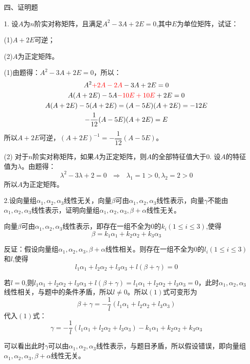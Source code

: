 \documentclass{article}
\begin{document}
四、证明题

1. 设$A$为$n$阶实对称矩阵，且满足$A^{2}-3A+2E=0$,其中$E$为单位矩阵，试证：

(1)$A+2E$可逆；

(2)$A$为正定矩阵。

\begin{zhengming}
(1)由题得：$A^{2}-3A+2E=0$，所以：
\begin{gather*}
  A^{2}\textcolor[rgb]{1.00,0.00,0.00}{+2A-2A}-3A+2E=0 \\
  A(A+2E)-5A\textcolor[rgb]{1.00,0.00,0.00}{-10E+10E}+2E=0 \\
  A(A+2E)-5(A+2E)=(A-5E)(A+2E)=-12E\\
  -\frac{1}{12}(A-5E)(A+2E)=E
\end{gather*}
所以$A+2E$可逆，$(A+2E)^{-1}=-\dfrac{1}{12}(A-5E)$。

(2) 对于$n$阶实对称矩阵，如果$A$为正定矩阵，则$A$的全部特征值大于0.
设$A$的特征值为$\lambda$。由题得：
\begin{equation*}
\lambda^2-3\lambda+2=0~~~\Rightarrow~~~\lambda_1=1>0,\lambda_2=2>0
\end{equation*}
所以$A$为正定矩阵。
\end{zhengming}

2.设向量组$\alpha_{1},\alpha_{2},\alpha_{3}$线性无关，向量$\beta$可由$\alpha_{1},\alpha_{2},\alpha_{3}$线性表示，向量$\gamma$不能由$\alpha_{1},\alpha_{2},\alpha_{3}$线性表示，证明向量组$\alpha_{1},\alpha_{2},\alpha_{3},\beta+\alpha$线性无关。

\begin{zhengming}
向量$\beta$可由$\alpha_{1},\alpha_{2},\alpha_{3}$线性表示，即存在一组不全为0的$k_{i}(1\leq i\leq3)$,使得
\begin{equation*}
 \beta=k_ {1}\alpha_{1}+k_{2}\alpha_{2}+k_{3}\alpha_{3}\tag{$1$}
\end{equation*}

反证：假设向量组$\alpha_{1},\alpha_{2},\alpha_{3},\beta+\alpha$线性相关。则存在一组不全为0的$l_{i}(1\leq i\leq3)$和$l$,使得
\begin{equation*}
l_ {1}\alpha_{1}+l_{2}\alpha_{2}+l_{3}\alpha_{3}+l(\beta+\gamma)=0\tag{$2$}
\end{equation*}

若$l=0$,则$l_ {1}\alpha_{1}+l_{2}\alpha_{2}+l_{3}\alpha_{3}+l(\beta+\gamma)=l_ {1}\alpha_{1}+l_{2}\alpha_{2}+l_{3}\alpha_{3}=0$，此时$\alpha_{1},\alpha_{2},\alpha_{3}$线性相关，与题中的条件矛盾，所以$l\neq0$。所以$(1)$式可变形为
\begin{equation*}
\beta+\gamma=-\frac{1}{l}(l_ {1}\alpha_{1}+l_{2}\alpha_{2}+l_{3}\alpha_{3})
\end{equation*}
代入$(1)$式：
\begin{equation*}
  \gamma=-\frac{1}{l}(l_ {1}\alpha_{1}+l_{2}\alpha_{2}+l_{3}\alpha_{3})-k_ {1}\alpha_{1}+k_{2}\alpha_{2}+k_{3}\alpha_{3}
\end{equation*}

可以看出此时$\gamma$可以由$\alpha_{1},\alpha_{2},\alpha_{3}$线性表示，与题目矛盾，所以假设错误，即向量组$\alpha_{1},\alpha_{2},\alpha_{3},\beta+\alpha$线性无关。
\end{zhengming}
\end{document}
